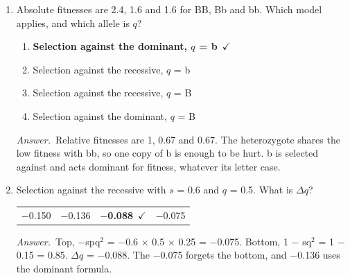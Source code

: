 \documentclass[11pt]{article}
\newcommand{\keyans}[1]{\par\medskip\noindent\textit{Answer.}\ #1\par\medskip}
\begin{document}
\begin{enumerate}[label=\textbf{\arabic*.}, leftmargin=2em, itemsep=1.4em]
\begin{enumerate}[label={}, leftmargin=2.4em, labelwidth=0pt, itemsep=2pt, topsep=0pt]
\end{enumerate}
\keyans{Average excess depends on where the allele's copies usually sit. A rare HbS copy is almost always in a heterozygote, the fittest genotype where malaria is common.}
\item Absolute fitnesses are 2.4, 1.6 and 1.6 for BB, Bb and bb. Which model applies, and which allele is \(q\)?
\nopagebreak\par{}
\par\smallskip
\begin{enumerate}[label={}, leftmargin=2.4em, labelwidth=0pt, itemsep=2pt, topsep=0pt]
\item \hspace*{-2.4em}\textbf{Selection against the dominant, \(q\) = b}\ \(\checkmark\)
\item \hspace*{-2.4em}Selection against the recessive, \(q\) = b
\item \hspace*{-2.4em}Selection against the recessive, \(q\) = B
\item \hspace*{-2.4em}Selection against the dominant, \(q\) = B
\end{enumerate}
\keyans{Relative fitnesses are 1, 0.67 and 0.67. The heterozygote shares the low fitness with bb, so one copy of b is enough to be hurt. b is selected against and acts dominant for fitness, whatever its letter case.}
\item Selection against the recessive with \(s\) = 0.6 and \(q\) = 0.5. What is \(\Delta q\)?
\nopagebreak\par{}
\par\smallskip\noindent\begin{tabularx}{\linewidth}{@{}YYYY@{}}
\(-\)0.150 & \(-\)0.136 & \textbf{\(-\)0.088}\ \(\checkmark\) & \(-\)0.075 \\
\end{tabularx}
\keyans{Top, \(-\)spq\(^2\) = \(-\)0.6 \(\times\) 0.5 \(\times\) 0.25 = \(-\)0.075. Bottom, 1 \(-\) sq\(^2\) = 1 \(-\) 0.15 = 0.85. \(\Delta q\) = \(-\)0.088. The \(-\)0.075 forgets the bottom, and \(-\)0.136 uses the dominant formula.}

\end{enumerate}
\end{document}
